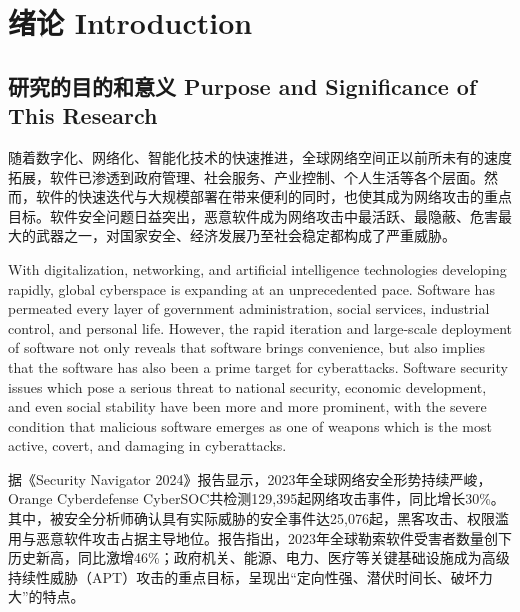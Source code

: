 %
%
%
%
\chapter{绪论 Introduction}

\label{chap:intro}
\section{研究的目的和意义 Purpose and Significance of This Research}

随着数字化、网络化、智能化技术的快速推进，全球网络空间正以前所未有的速度拓展，软件已渗透到政府管理、社会服务、产业控制、个人生活等各个层面。然而，软件的快速迭代与大规模部署在带来便利的同时，也使其成为网络攻击的重点目标。软件安全问题日益突出，恶意软件成为网络攻击中最活跃、最隐蔽、危害最大的武器之一，对国家安全、经济发展乃至社会稳定都构成了严重威胁。

With digitalization, networking, and artificial intelligence technologies developing rapidly, global cyberspace is expanding at an unprecedented pace. Software has permeated every layer of government administration, social services, industrial control, and personal life. However, the rapid iteration and large-scale deployment of software not only reveals that software brings convenience, but also implies that the software has also been a prime target for cyberattacks. Software security issues which pose a serious threat to national security, economic development, and even social stability have been more and more prominent, with the severe condition that malicious software emerges as one of weapons which is the most active, covert, and damaging in cyberattacks.

据《Security Navigator 2024》报告显示，2023年全球网络安全形势持续严峻，Orange Cyberdefense CyberSOC共检测129,395起网络攻击事件，同比增长30\%。其中，被安全分析师确认具有实际威胁的安全事件达25,076起，黑客攻击、权限滥用与恶意软件攻击占据主导地位。报告指出，2023年全球勒索软件受害者数量创下历史新高，同比激增46\%；政府机关、能源、电力、医疗等关键基础设施成为高级持续性威胁（APT）攻击的重点目标，呈现出“定向性强、潜伏时间长、破坏力大”的特点\cite{securitynavigator2024}。

